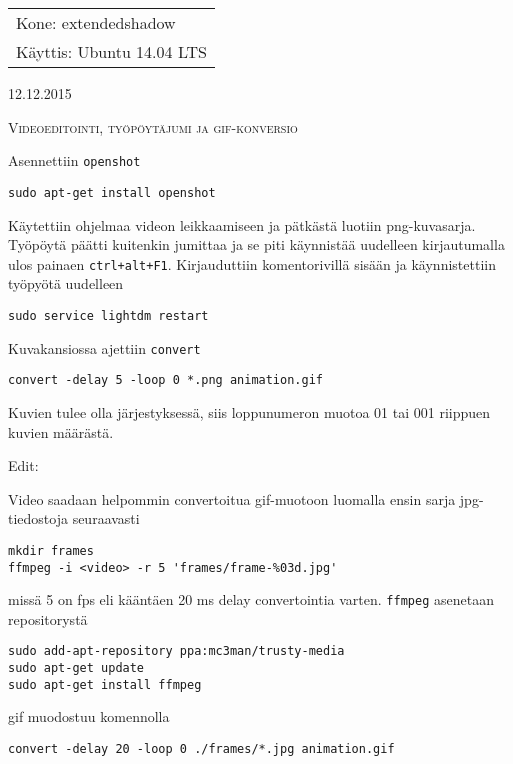 \documentclass[main.tex]{subfiles}
\begin{document}
\thispagestyle{empty}
\begin{tabular}[t]{l}
Kone: extendedshadow\\
Käyttis: Ubuntu 14.04 LTS
\end{tabular}
\hfill 12.12.2015

{\scshape\Large{Videoeditointi, työpöytäjumi ja gif-konversio}}

Asennettiin \texttt{openshot}

\begin{lstlisting}
sudo apt-get install openshot
\end{lstlisting}

Käytettiin ohjelmaa videon leikkaamiseen ja pätkästä luotiin png-kuvasarja. Työpöytä päätti kuitenkin jumittaa ja se piti käynnistää uudelleen kirjautumalla ulos painaen \texttt{ctrl+alt+F1}. Kirjauduttiin komentorivillä sisään ja käynnistettiin työpyötä uudelleen

\begin{lstlisting}
sudo service lightdm restart
\end{lstlisting}

Kuvakansiossa ajettiin \texttt{convert}

\begin{lstlisting}
convert -delay 5 -loop 0 *.png animation.gif
\end{lstlisting}

Kuvien tulee olla järjestyksessä, siis loppunumeron muotoa 01 tai 001 riippuen kuvien määrästä.

{\Large{Edit:}}

Video saadaan helpommin convertoitua gif-muotoon luomalla ensin sarja jpg-tiedostoja seuraavasti

\begin{lstlisting}
mkdir frames
ffmpeg -i <video> -r 5 'frames/frame-%03d.jpg'
\end{lstlisting}

missä 5 on fps eli kääntäen 20 ms delay convertointia varten. \texttt{ffmpeg} asenetaan repositorystä

\begin{lstlisting}
sudo add-apt-repository ppa:mc3man/trusty-media
sudo apt-get update
sudo apt-get install ffmpeg
\end{lstlisting}

gif muodostuu komennolla

\begin{lstlisting}
convert -delay 20 -loop 0 ./frames/*.jpg animation.gif
\end{lstlisting}
\end{document}
